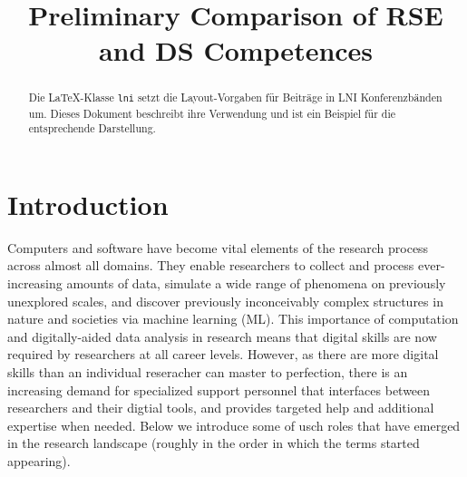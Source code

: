 \documentclass[
        english,biblatex
    ]{lni}
\begin{document}
        \title[]{Preliminary Comparison of RSE and DS Competences}
    
    
    

    \maketitle

        \begin{abstract}
        Die LaTeX-Klasse \texttt{lni} setzt die Layout-Vorgaben für
        Beiträge in LNI Konferenzbänden um. Dieses Dokument beschreibt
        ihre Verwendung und ist ein Beispiel für die entsprechende
        Darstellung.
    \end{abstract}
    
    
    \section{Introduction}\label{introduction}

    Computers and software have become vital elements of the research
    process across almost all domains. They enable researchers to
    collect and process ever-increasing amounts of data, simulate a wide
    range of phenomena on previously unexplored scales, and discover
    previously inconceivably complex structures in nature and societies
    via machine learning (ML). This importance of computation and
    digitally-aided data analysis in research means that digital skills
    are now required by researchers at all career levels. However, as
    there are more digital skills than an individual reseracher can
    master to perfection, there is an increasing demand for specialized
    support personnel that interfaces between researchers and their
    digtial tools, and provides targeted help and additional expertise
    when needed. Below we introduce some of usch roles that have emerged
    in the research landscape (roughly in the order in which the terms
    started appearing).
\end{document}
